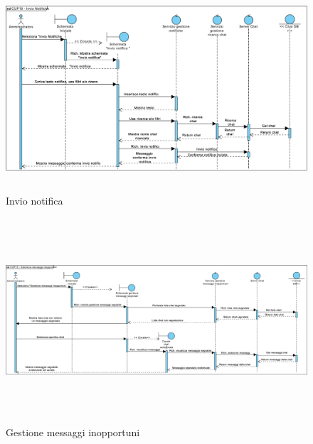 \begin{figure}
	\centering
	\includegraphics[height=3in,width=5in]{imgs/gruppo6/sequence/CUP18_invio_notifica.pdf}
	\caption{Invio notifica}
	\label{fig:prova}
\end{figure}


\begin{figure}
	\centering
	\includegraphics[height=3in,width=5in]{imgs/gruppo6/sequence/CUP19_gestione_messaggi_inopportuni.pdf}
	\caption{Gestione messaggi inopportuni}
	\label{fig:prova}
\end{figure}

